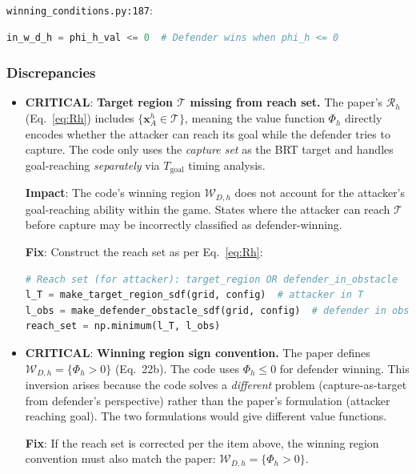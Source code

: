 \documentclass[11pt,a4paper]{article}
\begin{document}
\texttt{winning\_conditions.py:187}:
\begin{lstlisting}[language=Python]
in_w_d_h = phi_h_val <= 0  # Defender wins when phi_h <= 0
\end{lstlisting}

\subsubsection{Discrepancies}

\begin{itemize}
\item \textcolor{critred}{\textbf{CRITICAL}}: \textbf{Target region $\mathcal{T}$ missing from reach set.} The paper's $\mathcal{R}_h$ (Eq.~\ref{eq:Rh}) includes $\{\mathbf{x}^h_A \in \mathcal{T}\}$, meaning the value function $\Phi_h$ directly encodes whether the attacker can reach its goal while the defender tries to capture. The code only uses the \emph{capture set} as the BRT target and handles goal-reaching \emph{separately} via $T_{\mathrm{goal}}$ timing analysis.

\textbf{Impact}: The code's winning region $\mathcal{W}_{D,h}$ does not account for the attacker's goal-reaching ability within the game. States where the attacker can reach $\mathcal{T}$ before capture may be incorrectly classified as defender-winning.

\textbf{Fix}: Construct the reach set as per Eq.~\ref{eq:Rh}:
\begin{lstlisting}[language=Python]
# Reach set (for attacker): target_region OR defender_in_obstacle
l_T = make_target_region_sdf(grid, config)  # attacker in T
l_obs = make_defender_obstacle_sdf(grid, config)  # defender in obs
reach_set = np.minimum(l_T, l_obs)
\end{lstlisting}

\item \textcolor{critred}{\textbf{CRITICAL}}: \textbf{Winning region sign convention.} The paper defines $\mathcal{W}_{D,h} = \{\Phi_h > 0\}$ (Eq.~22b). The code uses $\Phi_h \leq 0$ for defender winning. This inversion arises because the code solves a \emph{different} problem (capture-as-target from defender's perspective) rather than the paper's formulation (attacker reaching goal). The two formulations would give different value functions.

\textbf{Fix}: If the reach set is corrected per the item above, the winning region convention must also match the paper: $\mathcal{W}_{D,h} = \{\Phi_h > 0\}$.


\end{itemize}
\end{document}
